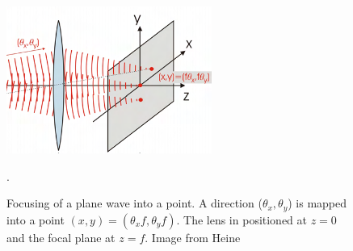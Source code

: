 \begin{figure}
    \centering
    \includegraphics[width=0.6\textwidth]{chapters/chapter_2/figures/fourier.png}
    \caption{Focusing of a plane wave into a point. A direction ($\theta_x, \theta_y$) is mapped into a point $(x,y) = (\theta_x f, \theta_y f)$. The lens in positioned at $z=0$ and the focal plane at $z=f$. Image from Heine \cite{article}}.
    \label{fig:fourier}
\end{figure}

